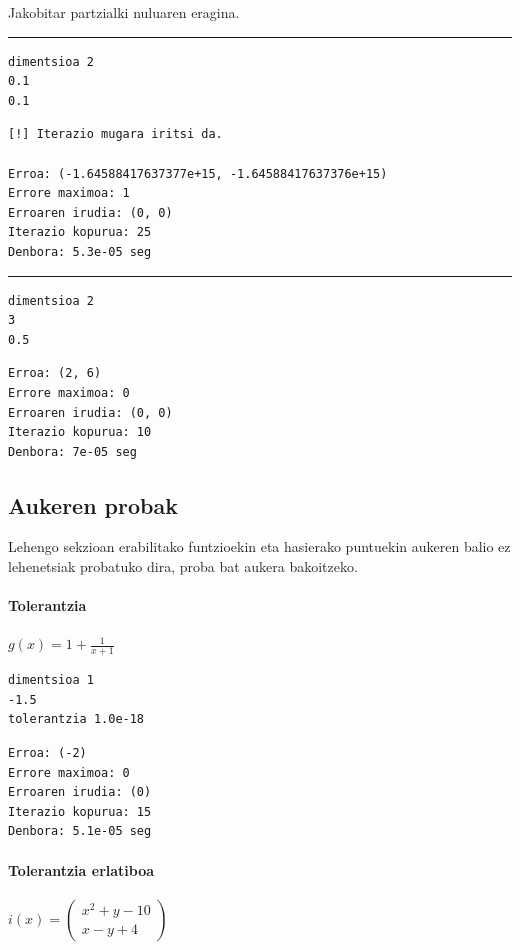 \documentclass[10pt,a4paper,basque]{article}
\begin{document}
Jakobitar partzialki nuluaren eragina.

\rule{12cm}{0.4pt}

\begin{lstlisting}
dimentsioa 2
0.1
0.1
\end{lstlisting}

\begin{lstlisting}
[!] Iterazio mugara iritsi da.

Erroa: (-1.64588417637377e+15, -1.64588417637376e+15)
Errore maximoa: 1
Erroaren irudia: (0, 0)
Iterazio kopurua: 25
Denbora: 5.3e-05 seg
\end{lstlisting}

\rule{12cm}{0.4pt}

\begin{lstlisting}
dimentsioa 2
3
0.5
\end{lstlisting}

\begin{lstlisting}
Erroa: (2, 6)
Errore maximoa: 0
Erroaren irudia: (0, 0)
Iterazio kopurua: 10
Denbora: 7e-05 seg
\end{lstlisting}

\subsection{Aukeren probak}

Lehengo sekzioan erabilitako funtzioekin eta hasierako puntuekin aukeren balio ez lehenetsiak probatuko dira, proba bat aukera bakoitzeko.

\paragraph{Tolerantzia}

$g(x) = 1 + \frac{1}{x + 1}$

\begin{lstlisting}
dimentsioa 1
-1.5
tolerantzia 1.0e-18
\end{lstlisting}

\begin{lstlisting}
Erroa: (-2)
Errore maximoa: 0
Erroaren irudia: (0)
Iterazio kopurua: 15
Denbora: 5.1e-05 seg
\end{lstlisting}

\paragraph{Tolerantzia erlatiboa}

$i(x) = \left(
\begin{array}{c}
x^2 + y - 10\\
x - y + 4
\end{array}
\right)$
\end{document}
